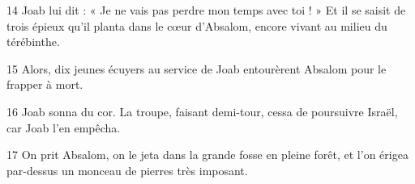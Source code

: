 
14 Joab lui dit : « Je ne vais pas perdre mon temps avec toi ! » Et il se saisit de trois épieux qu’il planta dans le cœur d’Absalom, encore vivant au milieu du térébinthe.

15 Alors, dix jeunes écuyers au service de Joab entourèrent Absalom pour le frapper à mort.

16 Joab sonna du cor. La troupe, faisant demi-tour, cessa de poursuivre Israël, car Joab l’en empêcha.

17 On prit Absalom, on le jeta dans la grande fosse en pleine forêt, et l’on érigea par-dessus un monceau de pierres très imposant.